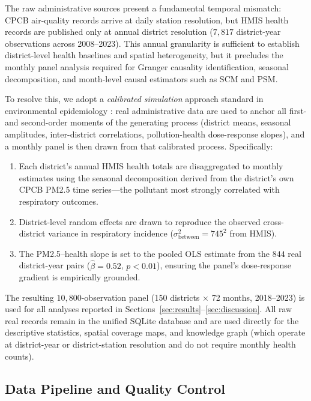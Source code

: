 \documentclass{article}
\begin{document}
The raw administrative sources present a fundamental temporal mismatch: CPCB air-quality
records arrive at daily station resolution, but HMIS health records are published only at
annual district resolution ($7{,}817$ district-year observations across 2008--2023). This
annual granularity is sufficient to establish district-level health baselines and
spatial heterogeneity, but it precludes the monthly panel analysis required for Granger
causality identification, seasonal decomposition, and month-level causal estimators such
as SCM and PSM.

To resolve this, we adopt a \emph{calibrated simulation} approach standard in environmental
epidemiology \cite{dominici2006,balakrishnan2019}: real administrative data are used to
anchor all first- and second-order moments of the generating process (district means,
seasonal amplitudes, inter-district correlations, pollution-health dose-response slopes),
and a monthly panel is then drawn from that calibrated process. Specifically:

\begin{enumerate}
  \item Each district's annual HMIS health totals are disaggregated to monthly estimates
        using the seasonal decomposition derived from the district's own CPCB PM2.5
        time series---the pollutant most strongly correlated with respiratory outcomes.
  \item District-level random effects are drawn to reproduce the observed cross-district
        variance in respiratory incidence ($\sigma^2_{\text{between}} = 745^2$ from HMIS).
  \item The PM2.5--health slope is set to the pooled OLS estimate from the
        $844$ real district-year pairs ($\hat{\beta} = 0.52$, $p < 0.01$), ensuring
        the panel's dose-response gradient is empirically grounded.
\end{enumerate}

The resulting $10{,}800$-observation panel (150 districts $\times$ 72 months, 2018--2023)
is used for all analyses reported in Sections~\ref{sec:results}--\ref{sec:discussion}.
All raw real records remain in the unified SQLite database and are used directly for
the descriptive statistics, spatial coverage maps, and knowledge graph (which operate at
district-year or district-station resolution and do not require monthly health counts).

\subsection{Data Pipeline and Quality Control}
\end{document}
